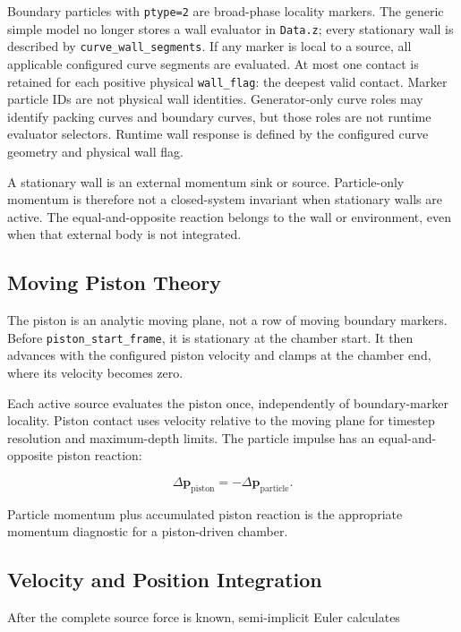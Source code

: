 Boundary particles with \texttt{ptype=2} are broad-phase locality
markers.  The generic simple model no longer stores a wall evaluator in
\texttt{Data.z}; every stationary wall is described by
\texttt{curve\_wall\_segments}.  If any marker is local to a source, all
applicable configured curve segments are evaluated.  At most one contact is
retained for each positive physical \texttt{wall\_flag}: the deepest valid
contact.  Marker particle IDs are not physical wall identities.
Generator-only curve roles may identify packing curves and boundary curves,
but those roles are not runtime evaluator selectors.  Runtime wall response is
defined by the configured curve geometry and physical wall flag.

A stationary wall is an external momentum sink or source.  Particle-only
momentum is therefore not a closed-system invariant when stationary walls are
active.  The equal-and-opposite reaction belongs to the wall or environment,
even when that external body is not integrated.

\subsection{Moving Piston Theory}

The piston is an analytic moving plane, not a row of moving boundary markers.
Before \texttt{piston\_start\_frame}, it is stationary at the chamber start.
It then advances with the configured piston velocity and clamps at the chamber
end, where its velocity becomes zero.

Each active source evaluates the piston once, independently of boundary-marker
locality.  Piston contact uses velocity relative to the moving plane for
timestep resolution and maximum-depth limits.  The particle impulse has an
equal-and-opposite piston reaction:

\begin{equation}
\Delta\mathbf p_{\mathrm{piston}}
=-\Delta\mathbf p_{\mathrm{particle}}.
\end{equation}

Particle momentum plus accumulated piston reaction is the appropriate
momentum diagnostic for a piston-driven chamber.

\subsection{Velocity and Position Integration}

After the complete source force is known, semi-implicit Euler calculates

